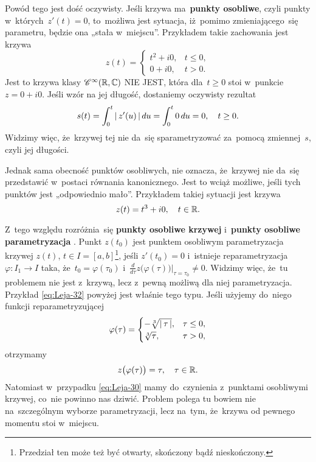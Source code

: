 \documentclass[a4paper,11pt]{article}
\begin{document}
Powód tego jest dość oczywisty. Jeśli krzywa ma~\textbf{punkty
  osobliwe}, czyli punkty w~których~$z'( t ) = 0$, to~możliwa jest
sytuacja, iż~pomimo zmieniającego~się parametru, będzie ona „stała
w~miejscu”. Przykładem takie zachowania jest krzywa
\begin{equation}
  \label{eq:Leja-30}
  z( t ) =
  \begin{cases}
    t^{ 2 } + i 0, & t \leq 0, \\
    0 + i 0, & t > 0.
  \end{cases}
\end{equation}
Jest to krzywa klasy $\mathcal{C}^{ \infty }( \mathbb{R}, \mathbb{C} )$ NIE JEST, która
dla~$t \geq 0$ stoi w~punkcie $z = 0 + i 0$. Jeśli wzór na jej
długość, dostaniemy oczywisty rezultat
\begin{equation}
  \label{eq:Leja-31}
  \begin{split}
    s( t ) = \int_{ 0 }^{ t } |\, {  z'( u )  } \,| \, du = \int_{ 0 }^{ t } 0 \,
    du = 0, \quad t \geq 0.
  \end{split}
\end{equation}
Widzimy więc, że~krzywej tej nie da~się sparametryzować za~pomocą
zmiennej~$s$, czyli jej długości.

Jednak sama obecność punktów osobliwych, nie oznacza, że~krzywej nie
da~się przedstawić w~postaci równania kanonicznego. Jest to wciąż
możliwe, jeśli tych punktów jest „odpowiednio mało”. Przykładem
takiej sytuacji jest krzywa
\begin{equation}
  \label{eq:Leja-32}
  z( t ) = t^{ 3 } + i 0, \quad t \in \mathbb{R}.
\end{equation}

Z~tego względu rozróżnia~się \textbf{punkty osobliwe krzywej}
i~\textbf{punkty osobliwe parametryzacja}
\cite{GdowskiElementGeometriiRozniczkowejZZadaniami1999}. Punkt
$z( t_{ 0 } )$ jest punktem osobliwym parametryzacja krzywej $z( t )$,
$t \in I = [ a, b ]$\footnote{Przedział ten może też być otwarty,
  skończony bądź nieskończony.}, jeśli $z'( t_{ 0 } ) = 0$ i~istnieje
reparametryzacja $\varphi: I_{ 1 } \to I$ taka,
że~$t_{ 0 } = \varphi( \tau_{ 0 } )$
i~$\tfrac{ d }{ d \tau } z\big( \varphi( \tau ) \big)|_{ \tau = \tau_{
    0 } } \neq 0$. Widzimy więc, że~tu problemem nie jest z~krzywą,
lecz z~pewną możliwą dla niej parametryzacja. Przykład
\eqref{eq:Leja-32} powyżej jest właśnie tego typu. Jeśli użyjemy
do~niego funkcji reparametryzującej
\begin{equation}
  \label{eq:Leja-33}
  \varphi( \tau ) =
  \begin{cases}
    -\sqrt[3]{ |\, {  \tau  } \,| }, & \tau \leq 0, \\
    \sqrt[3]{ \tau }, & \tau > 0,
  \end{cases}
\end{equation}
otrzymamy
\begin{equation}
  \label{eq:Leja-34}
  z\big( \varphi( \tau ) \big) = \tau, \quad \tau \in \mathbb{R}.
\end{equation}
Natomiast w~przypadku \eqref{eq:Leja-30} mamy do~czynienia z~punktami
osobliwymi krzywej, co~nie powinno nas dziwić. Problem polega tu
bowiem nie na~szczególnym wyborze parametryzacji, lecz na~tym,
że~krzywa od pewnego momentu stoi w~miejscu.
\end{document}
